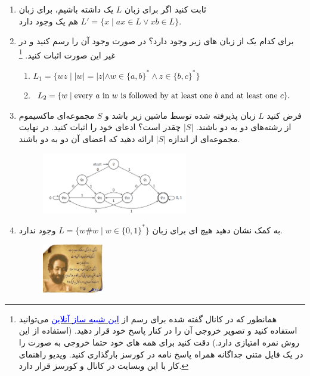 \documentclass{article}
\begin{document}
	\begin{enumerate}
		\item 
		 ثابت کنید اگر برای زبان $ L $ یک  داشته باشیم، برای زبان $L' = \{x \; | \; ax \in L  \vee  xb \in L\}$ هم یک   وجود دارد.
		\item 
		برای کدام یک از زبان های زیر  وجود دارد؟ در صورت وجود آن را رسم کنید و در غیر این صورت اثبات کنید.
		\footnote{
			همانطور که در کانال گفته شده برای رسم
			از
			\href{https://automatonsimulator.com/}{\textcolor{blue}{این شبیه ساز آنلاین}}
			می‌توانید استفاده کنید و تصویر خروجی آن را در کنار پاسخ خود قرار دهید. (استفاده از این روش نمره امتیازی دارد.) دقت کنید برای همه های خود حتما خروجی به صورت
			را در یک فایل متنی جداگانه همراه پاسخ نامه در کورسز بارگذاری کنید. ویدیو راهنمای کار با این وبسایت در کانال و کورسز قرار دارد.
		}
		\begin{latin}
			\begin{enumerate}
				\item 
				$L_1 = \{wz \; | \; |w|=|z| \wedge w \in \{a,b\}^* \wedge z \in \{b,c\}^* \}$
				\item 
				$L_2 = \{w \; | \; \text{every $a$ in $w$ is followed by at least one $b$ and at least one $ c $}\}. $
				
				
				
			\end{enumerate}
		\end{latin}

		\item 
		فرض کنید $L$ زبان پذیرفته شده توسط ماشین زیر باشد و $ S $ مجموعه‌ای ماکسیموم از رشته‌های دو به دو  باشند. $|S|$ چقدر است؟ ادعای خود را اثبات کنید. در نهایت مجموعه‌ای از اندازه $|S|$ ارائه دهید که اعضای آن دو به دو  باشند.
		\begin{figure}[h]
			\centering
			\includegraphics[width=0.6\textwidth]{image2}
		\end{figure}
	\item 
	 به کمک
	   نشان دهید هیچ ‌ای برای زبان
	 $L = \{w\#w \; |\;  w \in \{0,1\}^* \}$
	   وجود ندارد.
	  
	\begin{figure}[h]
		\centering
		\includegraphics[width=0.25\textwidth]{image}
	\end{figure}
	\end{enumerate}
\end{document}
